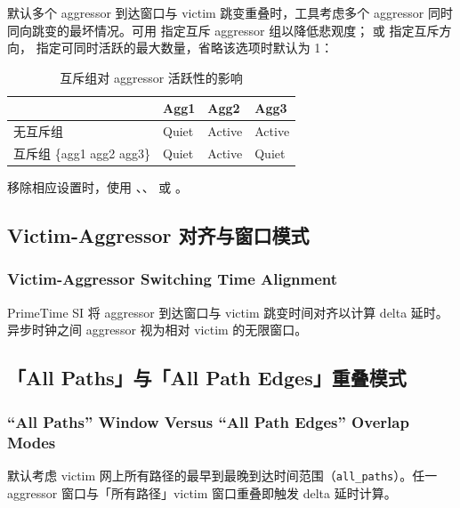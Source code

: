 默认多个 aggressor 到达窗口与 victim 跳变重叠时，工具考虑多个 aggressor 同时同向跳变的最坏情况。可用  指定互斥 aggressor 组以降低悲观度； 或  指定互斥方向， 指定可同时活跃的最大数量，省略该选项时默认为 1：

\begin{table}[htbp]
\centering
\caption{互斥组对 aggressor 活跃性的影响}
\small
\begin{tabular}{|l|l|l|l|}
\hline
 & Agg1 & Agg2 & Agg3 \\
\hline
无互斥组 & Quiet & Active & Active \\
互斥组 \{agg1 agg2 agg3\} & Quiet & Active & Quiet \\
\hline
\end{tabular}
\end{table}

移除相应设置时，使用 、、 或 。


\subsection{Victim-Aggressor 对齐与窗口模式}
\subsubsection*{Victim-Aggressor Switching Time Alignment}



PrimeTime SI 将 aggressor 到达窗口与 victim 跳变时间对齐以计算 delta 延时。异步时钟之间 aggressor 视为相对 victim 的无限窗口。

\subsection{「All Paths」与「All Path Edges」重叠模式}
\subsubsection*{``All Paths'' Window Versus ``All Path Edges'' Overlap Modes}

默认考虑 victim 网上所有路径的最早到最晚到达时间范围（\texttt{all\_paths}）。任一 aggressor 窗口与「所有路径」victim 窗口重叠即触发 delta 延时计算。

